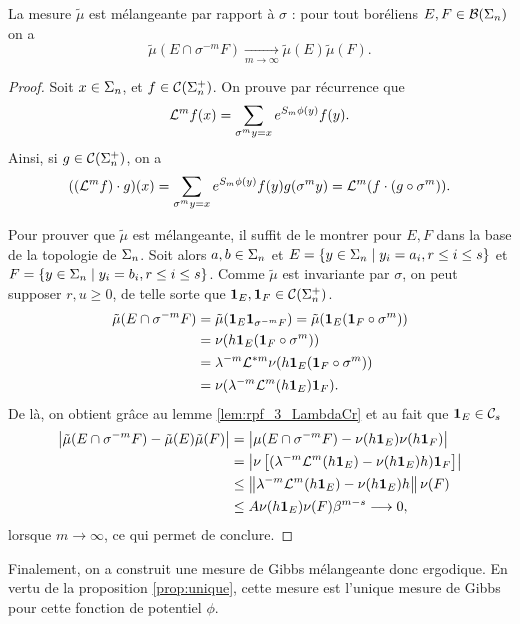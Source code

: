   \begin{proposition}
    \label{prop:mu_mixing}
    La mesure $\tilde\mu$ est mélangeante par rapport à $\sigma$ : pour tout boréliens $E, F \in \mathcal B(\Sigma_n)$ on a
    $$\tilde\mu(E \cap \sigma^{-m} F) \underset{m\to\infty}{\longrightarrow} \tilde\mu(E)\tilde\mu(F).$$
  \end{proposition}

  \begin{proof}
    Soit $x \in \Sigma_n$, et $f \in \mathcal{C} (\Sigma_{n}^+)$. On prouve par récurrence que
    $$\mathcal{L}^mf(x) = \sum_{\sigma^my=x}{e^{S_m\phi(y)}f(y)}.$$
    Ainsi, si $g \in \mathcal{C} (\Sigma_{n}^+)$, on a
    $$((\mathcal{L}^mf)\cdot g)(x) = \sum_{\sigma^my = x}{e^{S_m\phi(y)}f(y)g(\sigma^my)} = \mathcal{L}^m(f\cdot(g\circ\sigma^m)).$$

    Pour prouver que $\tilde\mu$ est mélangeante, il suffit de le montrer pour $E, F$ dans la base de la topologie de $\Sigma_n$.
    Soit alors $a, b \in \Sigma_n$ et $E = \{y \in \Sigma_n \mid y_i = a_i, r \leq i \leq s \}$ et $F = \{y \in \Sigma_n \mid y_i = b_i, r \leq i \leq s \}$.
    Comme $\tilde\mu$ est invariante par $\sigma$, on peut supposer $r, u \geq 0$, de telle sorte que $\mathbf{1}_{E}, \mathbf{1}_{F} \in \mathcal{C} (\Sigma_{n}^+)$.
    \begin{align*}
      \tilde\mu(E\cap\sigma^{-m}F) &= \tilde\mu(\mathbf{1}_{E}\mathbf{1}_{\sigma^{-m}F}) = \tilde\mu(\mathbf{1}_{E}(\mathbf{1}_{F}\circ\sigma^m)) \\
				   &= \nu(h\mathbf{1}_{E}(\mathbf{1}_{F}\circ\sigma^m)) \\
				   &= \lambda^{-m}\mathcal{L}^{*m}\nu(h\mathbf{1}_{E}(\mathbf{1}_{F}\circ\sigma^m)) \\
				   &= \nu(\lambda^{-m}\mathcal{L}^m(h\mathbf{1}_{E})\mathbf{1}_{F}).
    \end{align*}
    De là, on obtient grâce au lemme \ref{lem:rpf_3_LambdaCr} et au fait que $\mathbf{1}_{E} \in \mathcal C_{s}$
    \begin{align*}
      \left|\tilde\mu(E\cap\sigma^{-m}F)-\tilde\mu(E)\tilde\mu(F)\right| &= \left|\mu(E\cap\sigma^{-m}F) - \nu(h\mathbf{1}_{E})\nu(h\mathbf{1}_{F})\right| \\
									 &= \left|\nu\left[(\lambda^{-m}\mathcal{L}^m(h\mathbf{1}_{E})-\nu(h\mathbf{1}_{E})h)\mathbf{1}_{F}\right]\right| \\
									 &\leq \left\lVert \lambda^{-m}\mathcal{L}^m(h\mathbf{1}_{E}) - \nu(h\mathbf{1}_{E})h\right\rVert\nu(F) \\
									 &\leq A\nu(h\mathbf{1}_{E})\nu(F)\beta^{m-s} \longrightarrow 0,
    \end{align*}
    lorsque $m \to \infty$, ce qui permet de conclure.
  \end{proof}

  Finalement, on a construit une mesure de Gibbs mélangeante donc ergodique. En vertu de la proposition \ref{prop:unique},
  cette mesure est l'unique mesure de Gibbs pour cette fonction de potentiel $\phi$.
